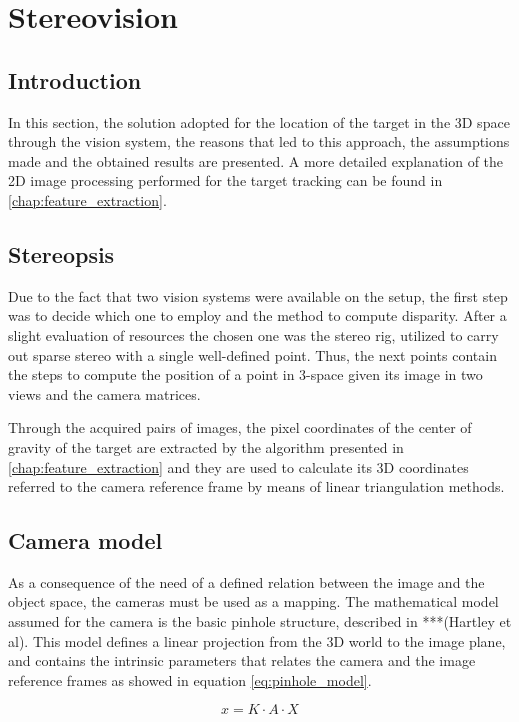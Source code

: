 
\chapter{Stereovision} %
\label{chap:stereopsis}

\section{Introduction}
In this section, the solution adopted for the location of the target in the 3D space through the vision system, the reasons that led to this approach, the assumptions made and the obtained results are presented. 
A more detailed explanation of the 2D image processing performed for the target tracking can be found in \ref{chap:feature_extraction}.

\section{Stereopsis}
Due to the fact that two vision systems were available on the setup, the first step was to decide which one to employ and the method to compute disparity. 
After a slight evaluation of resources the chosen one was the stereo rig, utilized to carry out sparse stereo with a single well-defined point. 
Thus, the next points contain the steps to compute the position of a point in 3-space given its image in two views and the camera matrices. 

Through the acquired pairs of images, the pixel coordinates of the center of gravity of the target are extracted by the algorithm presented in \ref{chap:feature_extraction} and they are used to calculate its 3D coordinates referred to the camera reference frame by means of linear triangulation methods.

\section{Camera model}
As a consequence of the need of a defined relation between the image and the object space, the cameras must be used as a mapping. 
The mathematical model assumed for the camera is the basic pinhole structure, described in ***(Hartley et al). 
This model defines a linear projection from the 3D world to the image plane, and contains the intrinsic parameters that relates the camera and the image reference frames as showed in equation \ref{eq:pinhole_model}. 

\begin{equation}
x = K·A·X
\label{eq:pinhole_model}
\end{equation}  

